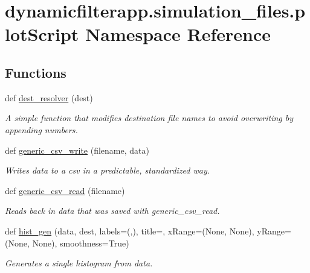 \hypertarget{namespacedynamicfilterapp_1_1simulation__files_1_1plot_script}{}\section{dynamicfilterapp.\+simulation\+\_\+files.\+plot\+Script Namespace Reference}
\label{namespacedynamicfilterapp_1_1simulation__files_1_1plot_script}
\subsection*{Functions}
\begin{DoxyCompactItemize}
\item 
def \hyperlink{namespacedynamicfilterapp_1_1simulation__files_1_1plot_script_a033562135f6f14ea0309f28fcf326ce9}{dest\+\_\+resolver} (dest)
\begin{DoxyCompactList}\small\item\em A simple function that modifies destination file names to avoid overwriting by appending numbers. \end{DoxyCompactList}\item 
def \hyperlink{namespacedynamicfilterapp_1_1simulation__files_1_1plot_script_afc50b7236c9fe752b68c9fe393c26230}{generic\+\_\+csv\+\_\+write} (filename, data)
\begin{DoxyCompactList}\small\item\em Writes data to a csv in a predictable, standardized way. \end{DoxyCompactList}\item 
def \hyperlink{namespacedynamicfilterapp_1_1simulation__files_1_1plot_script_a471203f34a5e5a8da0a8dae81ef6ddc7}{generic\+\_\+csv\+\_\+read} (filename)
\begin{DoxyCompactList}\small\item\em Reads back in data that was saved with generic\+\_\+csv\+\_\+read. \end{DoxyCompactList}\item 
def \hyperlink{namespacedynamicfilterapp_1_1simulation__files_1_1plot_script_adc58c0bae220ebecc2001221654f8b50}{hist\+\_\+gen} (data, dest, labels=(\textquotesingle{}\textquotesingle{},\textquotesingle{}\textquotesingle{}), title=\textquotesingle{}\textquotesingle{}, x\+Range=(None, None), y\+Range=(None, None), smoothness=True)
\begin{DoxyCompactList}\small\item\em Generates a single histogram from data. \end{DoxyCompactList}\item 

\end{DoxyCompactItemize}
